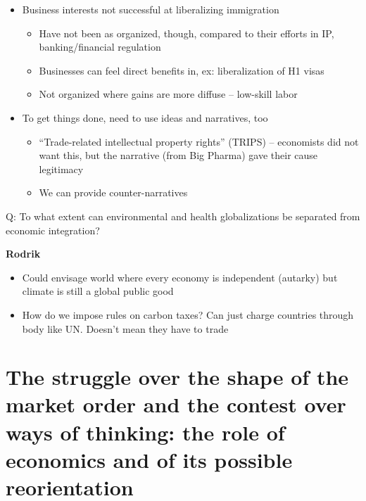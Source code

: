 \begin{itemize}
\tightlist
\item
  Business interests not successful at liberalizing immigration

  \begin{itemize}
  \tightlist
  \item
    Have not been as organized, though, compared to their efforts in IP,
    banking/financial regulation
  \item
    Businesses can feel direct benefits in, ex: liberalization of H1
    visas
  \item
    Not organized where gains are more diffuse -- low-skill labor
  \end{itemize}
\item
  To get things done, need to use ideas and narratives, too

  \begin{itemize}
  \tightlist
  \item
    ``Trade-related intellectual property rights'' (TRIPS) -- economists
    did not want this, but the narrative (from Big Pharma) gave their
    cause legitimacy
  \item
    We can provide counter-narratives
  \end{itemize}
\end{itemize}

Q: To what extent can environmental and health globalizations be
separated from economic integration?

\textbf{Rodrik}

\begin{itemize}
\tightlist
\item
  Could envisage world where every economy is independent (autarky) but
  climate is still a global public good
\item
  How do we impose rules on carbon taxes? Can just charge countries
  through body like UN. Doesn't mean they have to trade
\end{itemize}

\hypertarget{the-struggle-over-the-shape-of-the-market-order-and-the-contest-over-ways-of-thinking-the-role-of-economics-and-of-its-possible-reorientation}{%
\section{The struggle over the shape of the market order and the contest
over ways of thinking: the role of economics and of its possible
reorientation}\label{the-struggle-over-the-shape-of-the-market-order-and-the-contest-over-ways-of-thinking-the-role-of-economics-and-of-its-possible-reorientation}}

